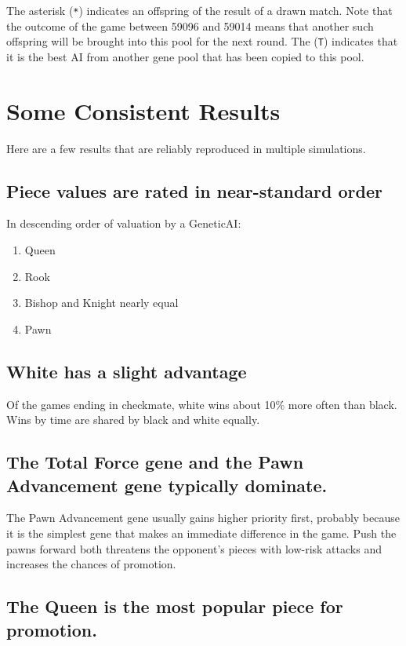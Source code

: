 \documentclass[letter]{article}
\renewcommand\_{\textunderscore\allowbreak}
\begin{document}
The asterisk (\verb|*|) indicates an offspring of the result of a drawn match. Note that the outcome of the game between 59096 and 59014 means that another such offspring will be brought into this pool for the next round. The (\verb|T|) indicates that it is the best AI from another gene pool that has been copied to this pool.


\section{Some Consistent Results}

Here are a few results that are reliably reproduced in multiple simulations.

\subsection*{Piece values are rated in near-standard order}
In descending order of valuation by a Genetic\_AI:
\begin{enumerate}
	\item Queen
	\item Rook
	\item Bishop and Knight nearly equal
	\item Pawn
\end{enumerate}

\subsection*{White has a slight advantage}

Of the games ending in checkmate, white wins about 10\% more often than black. Wins by time are shared by black and white equally.

\subsection*{The Total Force gene and the Pawn Advancement gene typically dominate.}

The Pawn Advancement gene usually gains higher priority first, probably because it is the simplest gene that makes an immediate difference in the game. Push the pawns forward both threatens the opponent's pieces with low-risk attacks and increases the chances of promotion.

\subsection*{The Queen is the most popular piece for promotion.}
\end{document}
